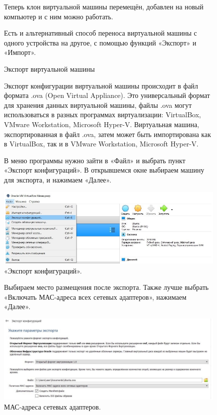 \begin{figure}
\quad Теперь клон виртуальной машины перемещён, добавлен на новый компьютер и с ним можно работать.
\end{figure}

\begin{figure}
\quad Есть и альтернативный способ переноса виртуальной машины с одного устройства на другое, с помощью функций «Экспорт» и «Импорт».
\end{figure}

\begin{figure}
\centering
Экспорт виртуальной машины
\label{ris:image}
\end{figure}

\begin{figure}
\quad Экспорт конфигурации виртуальной машины происходит в файл формата .ova (Open Virtual Appliance). Это универсальный формат для хранения данных виртуальной машины, файлы .ova могут использоваться в разных программах виртуализации: VirtualBox, VMware Workstation, Microsoft Hyper-V. Виртуальная машина, экспортированная в файл .ova, затем может быть импортирована как в VirtualBox, так и в VMware Workstation, Microsoft Hyper-V.
\end{figure}

\begin{figure}
\quad В меню программы нужно зайти в «Файл» и выбрать пункт «Экспорт конфигураций». В открывшемся окне выбираем машину для экспорта, и нажимаем «Далее».

		\centering
		\includegraphics[width=0.65\linewidth]{img/12.png}
\caption{«Экспорт конфигураций».}
\label{ris:image}

\end{figure}

\begin{figure}
\quad Выбираем место размещения после экспорта. Также лучше выбрать «Включать МАС-адреса всех сетевых адаптеров», нажимаем «Далее».

		\centering
		\includegraphics[width=0.65\linewidth]{img/13.png}
\caption{МАС-адреса сетевых адаптеров.}
\label{ris:image}

\end{figure}


